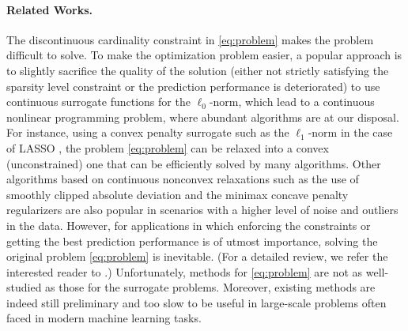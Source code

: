 \documentclass{article}
\newcommand{\alert}[1]{{#1}}
\theoremstyle{plain}
\theoremstyle{definition}
\theoremstyle{remark}
\newcommand{\cp}[1]{\footnote{\textbf{CP:} #1}}
\begin{document}
\paragraph{Related Works.} The discontinuous cardinality constraint in 
\cref{eq:problem} makes
the problem difficult to solve.
To make the optimization problem easier, a popular approach is to
slightly sacrifice the quality of the solution (either not strictly
satisfying the sparsity level constraint or the prediction performance
is deteriorated)
to use continuous surrogate functions for
the $\ell_0$-norm, which lead to a continuous nonlinear programming
problem, where abundant algorithms are at our disposal.
For instance, using a convex penalty surrogate such as the 
$\ell_1$-norm in the case of LASSO \citep{Tibshirani96}, the problem 
\cref{eq:problem} can be relaxed into a convex (unconstrained) one that can be
efficiently solved by many algorithms.
Other algorithms based on continuous nonconvex
relaxations such as the use of smoothly clipped absolute deviation
\citep{FanLi01} and the minimax concave penalty \citep{Zhang10}
regularizers are also popular in scenarios with a higher level of noise
and outliers in the data. 
However, for applications in which enforcing the constraints or
getting the best prediction performance is of utmost importance, solving
the original problem \cref{eq:problem} is inevitable. \alert{(For a detailed
review, we refer the 
	interested reader to \cite[Section 1]{BKM16}.)}
Unfortunately, methods for \cref{eq:problem} are not as well-studied as
those for the surrogate problems.
Moreover, existing methods are indeed
still preliminary and too slow to be useful in large-scale problems
often faced in modern machine learning tasks.
\end{document}

